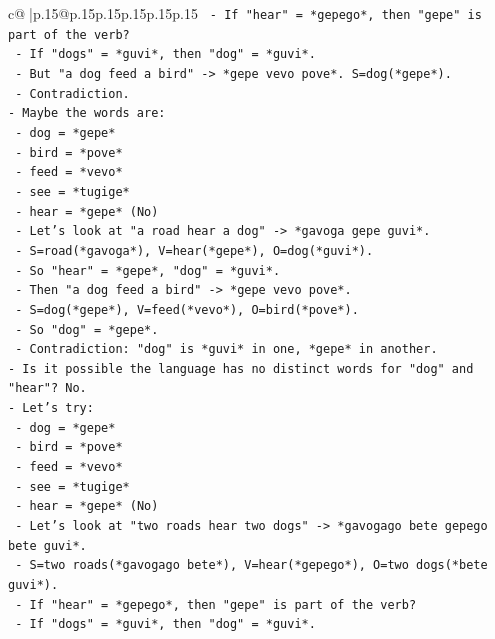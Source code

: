 \documentclass{article}
\begin{document}
{\begin{supertabular}{c@{$\;$}|p{.15\linewidth}@{}p{.15\linewidth}p{.15\linewidth}p{.15\linewidth}p{.15\linewidth}p{.15\linewidth}}
{{{\texttt{      {-} If "hear" = *gepego*, then "gepe" is part of the verb?} \\
\texttt{      {-} If "dogs" = *guvi*, then "dog" = *guvi*.} \\
\texttt{      {-} But "a dog feed a bird" {-}> *gepe vevo pove*. S=dog(*gepe*).} \\
\texttt{      {-} Contradiction.} \\
\texttt{{-} Maybe the words are:} \\
\texttt{  {-} dog = *gepe*} \\
\texttt{  {-} bird = *pove*} \\
\texttt{  {-} feed = *vevo*} \\
\texttt{  {-} see = *tugige*} \\
\texttt{  {-} hear = *gepe* (No)} \\
\texttt{  {-} Let's look at "a road hear a dog" {-}> *gavoga gepe guvi*.} \\
\texttt{    {-} S=road(*gavoga*), V=hear(*gepe*), O=dog(*guvi*).} \\
\texttt{    {-} So "hear" = *gepe*, "dog" = *guvi*.} \\
\texttt{  {-} Then "a dog feed a bird" {-}> *gepe vevo pove*.} \\
\texttt{    {-} S=dog(*gepe*), V=feed(*vevo*), O=bird(*pove*).} \\
\texttt{    {-} So "dog" = *gepe*.} \\
\texttt{  {-} Contradiction: "dog" is *guvi* in one, *gepe* in another.} \\
\texttt{{-} Is it possible the language has no distinct words for "dog" and "hear"? No.} \\
\texttt{{-} Let's try:} \\
\texttt{  {-} dog = *gepe*} \\
\texttt{  {-} bird = *pove*} \\
\texttt{  {-} feed = *vevo*} \\
\texttt{  {-} see = *tugige*} \\
\texttt{  {-} hear = *gepe* (No)} \\
\texttt{  {-} Let's look at "two roads hear two dogs" {-}> *gavogago bete gepego bete guvi*.} \\
\texttt{    {-} S=two roads(*gavogago bete*), V=hear(*gepego*), O=two dogs(*bete guvi*).} \\
\texttt{    {-} If "hear" = *gepego*, then "gepe" is part of the verb?} \\
\texttt{    {-} If "dogs" = *guvi*, then "dog" = *guvi*.} \\
}}}
\end{supertabular}}
\end{document}
